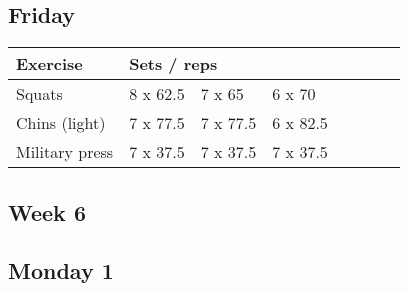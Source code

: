 \documentclass[12pt, a4paper]{article}%
\begin{document}
  \subsection*{\hspace{0.5em} Friday }


  \begin{tabular}{l|lllllll}
  \hspace{0.75em} \textbf{Exercise} & \multicolumn{ 7 }{l}{ \textbf{Sets / reps} } \\ \hline

            \hspace{0.75em} Squats
            & 8 x 62.5
            & 7 x 65
            & 6 x 70
            & 
            & 
            & 
            & 
            \\


            \hspace{0.75em} Chins (light)
            & 7 x 77.5
            & 7 x 77.5
            & 6 x 82.5
            & 
            & 
            & 
            & 
            \\


            \hspace{0.75em} Military press
            & 7 x 37.5
            & 7 x 37.5
            & 7 x 37.5
            & 
            & 
            & 
            & 
            \\


  \end{tabular}


\clearpage \subsection*{\hspace{0.25em} Week 6 }
  \subsection*{\hspace{0.5em} Monday 1 }
\end{document}
